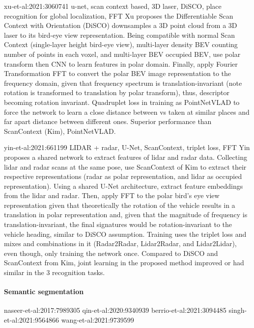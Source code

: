 xu-et-al:2021:3060741 u-net, scan context based, 3D laser, DiSCO, place recognition for global localization, FFT
Xu proposes the Differentiable Scan Context with Orientation (DiSCO) downsamples a 3D point cloud from a 3D laser to its bird-eye view representation. Being compatible with normal Scan Context (single-layer height bird-eye view), multi-layer density BEV counting number of points in each voxel, and multi-layer BEV occupied BEV, use polar transform then CNN to learn features in polar domain. Finally, apply Fourier Transformation FFT to convert the polar BEV image representation to the frequency domain, given that frequency spectrum is translation-invariant (note rotation is transformed to translation by polar transform), thus, descriptor becoming rotation invariant.
Quadruplet loss in training as PointNetVLAD to force the network to learn a close distance between vs taken at similar places and far apart distance between different ones.
Superior performance than ScanContext (Kim), PointNetVLAD.

yin-et-al:2021:661199 LIDAR + radar, U-Net, ScanContext, triplet loss, FFT
Yin proposes a shared network to extract features of lidar and radar data. Collecting lidar and radar scans at the same pose, use ScanContext of Kim to extract their respective representations (radar as polar representation, and lidar as occupied representation). Using a shared U-Net architecture, extract feature embeddings from the lidar and radar. Then, apply FFT to the polar bird's eye view representation given that theoretically the rotation of the vehicle results in a translation in polar representation and, given that the magnitude of frequency is translation-invariant, the final signatures would be rotation-invariant to the vehicle heading, similar to DiSCO assumption.
Training uses the triplet loss and mixes and combinations in it (Radar2Radar, Lidar2Radar, and Lidar2Lidar), even though, only training the network once.
Compared to DiSCO and ScanContext from Kim, joint learning in the proposed method improved or had similar in the 3 recognition tasks.








\paragraph{Semantic segmentation}

naseer-et-al:2017:7989305
qin-et-al:2020:9340939
berrio-et-al:2021:3094485
singh-et-al:2021:9564866
wang-et-al:2021:9739599


